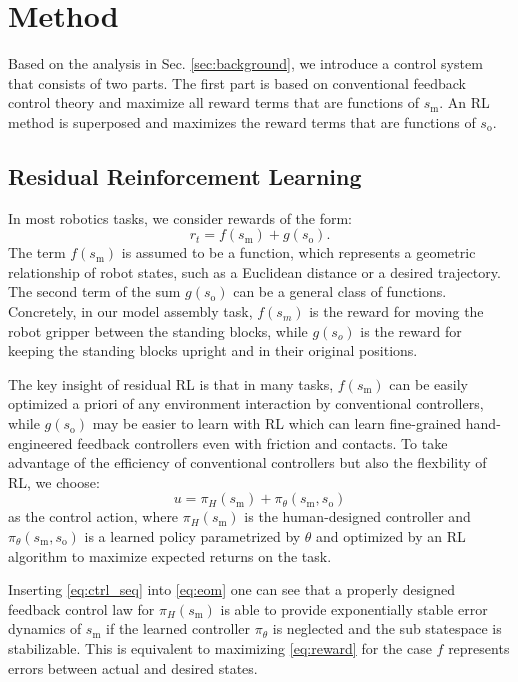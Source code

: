 \section{Method}\label{sec:method}

Based on the analysis in Sec. \ref{sec:background}, we introduce a control system that consists of two parts. The first part is based on conventional feedback control theory and maximize all reward terms that are functions of $s_\text{m}$. An RL method is superposed and maximizes the reward terms that are functions of $s_\text{o}$.

\subsection{Residual Reinforcement Learning}
In most robotics tasks, we consider rewards of the form:
%
\begin{equation}\label{eq:reward}
    r_t = f(s_\text{m}) + g(s_\text{o}).
\end{equation}
%
The term $f(s_\text{m})$ is assumed to be a function, which represents a geometric relationship of robot states, such as a Euclidean distance or a desired trajectory.
The second term of the sum $g(s_\text{o})$ can be a general class of functions. Concretely, in our model assembly task, $f(s_m)$ is the reward for moving the robot gripper between the standing blocks, while $g(s_o)$ is the reward for keeping the standing blocks upright and in their original positions.

The key insight of residual RL is that in many tasks, $f(s_\text{m})$ can be easily optimized a priori of any environment interaction by conventional controllers, while $g(s_\text{o})$ may be easier to learn with RL which can learn fine-grained hand-engineered feedback controllers even with friction and contacts.
To take advantage of the efficiency of conventional controllers but also the flexbility of RL, we choose:
%
\begin{equation}\label{eq:ctrl_seq}
    u = \pi_H(s_\text{m}) + \pi_\theta(s_\text{m}, s_\text{o})
\end{equation}
%
as the control action, where $\pi_H(s_\text{m})$ is the human-designed controller and $\pi_\theta(s_\text{m}, s_\text{o})$ is a learned policy parametrized by $\theta$ and optimized by an RL algorithm to maximize expected returns on the task.

Inserting \eqref{eq:ctrl_seq} into \eqref{eq:eom} one can see that a properly designed feedback control law for $\pi_H(s_\text{m})$ is able to provide exponentially stable error dynamics of $s_\text{m}$ if the learned controller $\pi_\theta$ is neglected and the sub statespace is stabilizable.
This is equivalent to maximizing \eqref{eq:reward} for the case $f$ represents errors between actual and desired states.

